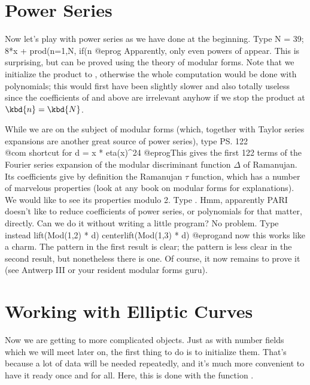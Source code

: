 \section{Power Series}

Now let's play with power series as we have done at the beginning.  Type
\bprog
  N = 39;
  8*x + prod(n=1,N, if(n%
@eprog\noindent
Apparently, only even powers of  appear. This is surprising, but can
be proved using the theory of modular forms. Note that we initialize
the product to , otherwise the whole computation would
be done with polynomials; this would first have been slightly slower and also
totally useless since the coefficients of  and above are
irrelevant anyhow if we stop the product at $\kbd{n} = \kbd{N}$.

While we are on the subject of modular forms (which, together with Taylor
series expansions are another great source of power series), type
\bprog
  \ps 122     \\@com shortcut for 
  d = x * eta(x)^24
@eprog\noindent This gives the first 122 terms of the Fourier series
expansion of the modular discriminant function $\Delta$ of Ramanujan. Its
coefficients give by definition the Ramanujan $\tau$ function, which has a
number of marvelous properties (look at any book on modular forms for
explanations). We would like to see its properties modulo 2. Type .
Hmm, apparently PARI doesn't like to reduce coefficients of power series, or
polynomials for that matter, directly. Can we do it without writing a little
program? No problem. Type instead
\bprog
  lift(Mod(1,2) * d)
  centerlift(Mod(1,3) * d)
@eprog\noindent and now this works like a charm. The pattern in the first
result is clear; the pattern is less clear in the second result, but
nonetheless there is one. Of course, it now remains to prove it (see Antwerp
III or your resident modular forms guru).

\section{Working with Elliptic Curves}

Now we are getting to more complicated objects. Just as with number fields
which we will meet later on, the first thing to do is to initialize them.
That's because a lot of data will be needed repeatedly, and it's much more
convenient to have it ready once and for all. Here, this is done with the
function .

